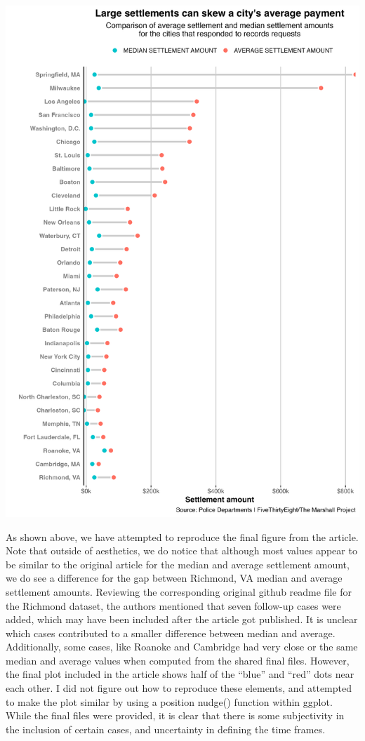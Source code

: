 \documentclass[
  letterpaper,
  DIV=11,
  numbers=noendperiod]{scrartcl}
\begin{document}
\includegraphics{plots/Figure3_output_segmentplot.png}

As shown above, we have attempted to reproduce the final figure from the
article. Note that outside of aesthetics, we do notice that although
most values appear to be similar to the original article for the median
and average settlement amount, we do see a difference for the gap
between Richmond, VA median and average settlement amounts. Reviewing
the corresponding original github readme file for the Richmond dataset,
the authors mentioned that seven follow-up cases were added, which may
have been included after the article got published. It is unclear which
cases contributed to a smaller difference between median and average.
Additionally, some cases, like Roanoke and Cambridge had very close or
the same median and average values when computed from the shared final
files. However, the final plot included in the article shows half of the
``blue'' and ``red'' dots near each other. I did not figure out how to
reproduce these elements, and attempted to make the plot similar by
using a position nudge() function within ggplot. While the final files
were provided, it is clear that there is some subjectivity in the
inclusion of certain cases, and uncertainty in defining the time frames.
\end{document}
